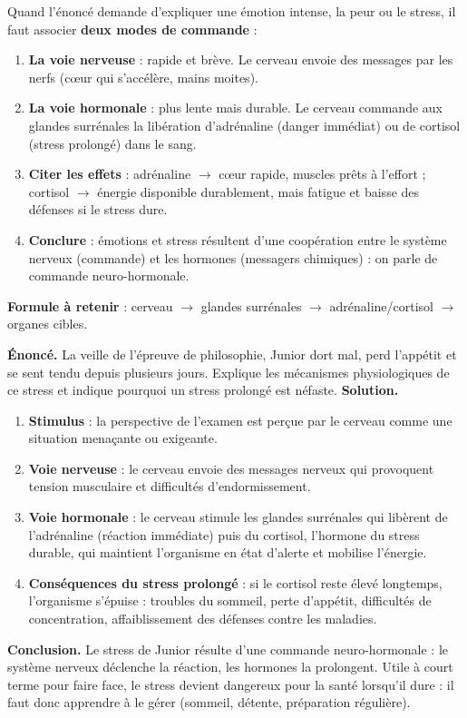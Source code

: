 \documentclass[11pt]{article}
\newcommand{\cle}[1]{{\popxbold\color{popdark}#1}}
\begin{document}
\begin{methode}
Quand l'énoncé demande d'expliquer une émotion intense, la peur ou le stress, il faut associer \textbf{deux modes de commande} :
\begin{enumerate}
\item \textbf{La voie nerveuse} : rapide et brève. Le cerveau envoie des messages par les nerfs (cœur qui s'accélère, mains moites).
\item \textbf{La voie hormonale} : plus lente mais durable. Le cerveau commande aux \cle{glandes surrénales} la libération d'\cle{adrénaline} (danger immédiat) ou de \cle{cortisol} (stress prolongé) dans le sang.
\item \textbf{Citer les effets} : adrénaline $\rightarrow$ cœur rapide, muscles prêts à l'effort ; cortisol $\rightarrow$ énergie disponible durablement, mais fatigue et baisse des défenses si le stress dure.
\item \textbf{Conclure} : émotions et stress résultent d'une \cle{coopération} entre le système nerveux (commande) et les hormones (messagers chimiques) : on parle de commande \cle{neuro-hormonale}.
\end{enumerate}
\textbf{Formule à retenir} : cerveau $\rightarrow$ glandes surrénales $\rightarrow$ adrénaline/cortisol $\rightarrow$ organes cibles.
\end{methode}

\begin{exoresolu}
\textbf{Énoncé.} La veille de l'épreuve de philosophie, Junior dort mal, perd l'appétit et se sent tendu depuis plusieurs jours. Explique les mécanismes physiologiques de ce stress et indique pourquoi un stress prolongé est néfaste.
\tcblower
\textbf{Solution.}
\begin{enumerate}
\item \textbf{Stimulus} : la perspective de l'examen est perçue par le cerveau comme une situation menaçante ou exigeante.
\item \textbf{Voie nerveuse} : le cerveau envoie des messages nerveux qui provoquent tension musculaire et difficultés d'endormissement.
\item \textbf{Voie hormonale} : le cerveau stimule les glandes surrénales qui libèrent de l'\cle{adrénaline} (réaction immédiate) puis du \cle{cortisol}, l'hormone du stress durable, qui maintient l'organisme en état d'alerte et mobilise l'énergie.
\item \textbf{Conséquences du stress prolongé} : si le cortisol reste élevé longtemps, l'organisme s'épuise : troubles du sommeil, perte d'appétit, difficultés de concentration, affaiblissement des défenses contre les maladies.
\end{enumerate}
\textbf{Conclusion.} Le stress de Junior résulte d'une commande neuro-hormonale : le système nerveux déclenche la réaction, les hormones la prolongent. Utile à court terme pour faire face, le stress devient dangereux pour la santé lorsqu'il dure : il faut donc apprendre à le gérer (sommeil, détente, préparation régulière).
\end{exoresolu}
\end{document}
